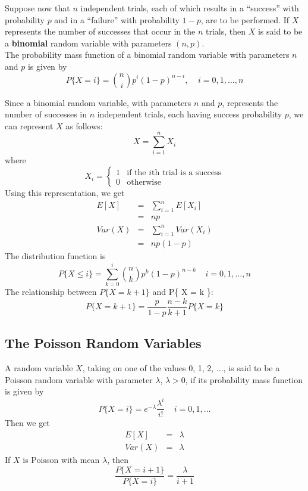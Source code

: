 \documentclass[12pt]{article}
\begin{document}
Suppose now that $n$ independent trials, each of which results in a ``success'' with probability $p$ and in a ``failure'' with probability $1-p$, are to be performed. If $X$ represents the number of successes that occur in the $n$ trials, then $X$ is said to be a \textbf{binomial} random variable with parameters $(n,p)$. \\

The probability mass function of a binomial random variable with parameters $n$ and $p$ is given by
\begin{equation*}
  P\{ X=i \} = \binom{n}{i} p^i (1-p)^{n-i}, \;\;\;\; i =0,1,\dots,n
\end{equation*}

Since a binomial random variable, with parameters $n$ and $p$, represents the number of successes in $n$ independent trials, each having success probability $p$, we can represent $X$ as follows:
\begin{equation*}
  X = \sum_{i=1}^n X_i
\end{equation*}
where
\begin{equation*}
  X_i =
  \begin{cases}
    1 & \text{if the $i$th trial is a success} \\
    0 & \text{otherwise}
  \end{cases}
\end{equation*}
Using this representation, we get
\begin{eqnarray*}
  E[X]
  &=& \sum_{i=1}^n E[X_i] \\
  &=& np \\
  Var(X)
  &=& \sum_{i=1}^n Var(X_i) \\
  &=& np(1-p)
\end{eqnarray*}
The distribution function is
\begin{equation*}
  P\{ X \le i \}
  = \sum_{k=0}^i \binom{n}{k} p^k (1-p)^{n-k} \;\;\;\; i = 0,1,\dots,n
\end{equation*}
The relationship between $P\{ X = k+1 \}$ and P\{ X = k \}:
\begin{equation*}
  P\{ X = k+1 \}
  = \frac{p}{1-p} \frac{n-k}{k+1} P\{ X = k \}
\end{equation*}

\subsection{The Poisson Random Variables}

A random variable $X$, taking on one of the values 0, 1, 2, ..., is said to be a Poisson random variable with parameter $\lambda$, $\lambda>0$, if its probability mass function is given by
\begin{equation*}
  P\{ X=i \} = e^{-\lambda} \frac{\lambda^i}{i!} \;\;\;\; i = 0,1,\dots
\end{equation*}
Then we get
\begin{eqnarray*}
  E[X] &=& \lambda \\
  Var(X) &=& \lambda
\end{eqnarray*}
If $X$ is Poisson with mean $\lambda$, then
\begin{equation*}
  \frac {P\{X=i+1\}}{P\{X=i\}}
  = \frac {\lambda}{i+1}
\end{equation*}
\end{document}
